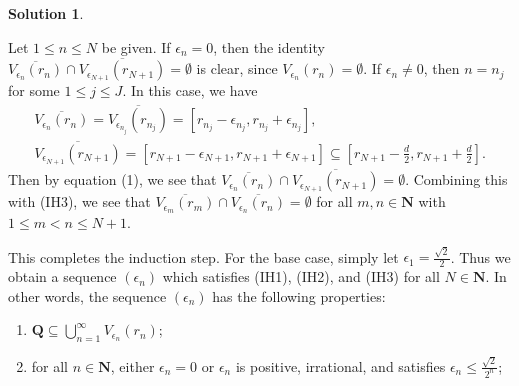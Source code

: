 \documentclass[12pt]{article}
\theoremstyle{definition}
\theoremstyle{exercise}
\theoremstyle{solution}
\newtheorem*{solution}{Solution}
\newcommand{\N}{\mathbf{N}}
\newcommand{\Q}{\mathbf{Q}}
\begin{document}
\begin{solution}
\begin{enumerate}
\begin{description}
            Let \( 1 \leq n \leq N \) be given. If \( \epsilon_n = 0 \), then the identity \( \overline{V_{\epsilon_n}(r_n)} \cap \overline{V_{\epsilon_{N+1}}(r_{N+1})} = \emptyset \) is clear, since \( V_{\epsilon_n}(r_n) = \emptyset \). If \( \epsilon_n \neq 0 \), then \( n = n_j \) for some \( 1 \leq j \leq J \). In this case, we have
            \begin{gather*}
                \overline{V_{\epsilon_n}(r_n)} = \overline{V_{\epsilon_{n_j}}(r_{n_j})} = [r_{n_j} - \epsilon_{n_j}, r_{n_j} + \epsilon_{n_j}], \\[2mm]
                \overline{V_{\epsilon_{N+1}}(r_{N+1})} = [r_{N+1} - \epsilon_{N+1}, r_{N+1} + \epsilon_{N+1}] \subseteq \left[ r_{N+1} - \tfrac{d}{2}, r_{N+1} + \tfrac{d}{2} \right].
            \end{gather*}
            Then by equation (1), we see that \( \overline{V_{\epsilon_n}(r_n)} \cap \overline{V_{\epsilon_{N+1}}(r_{N+1})} = \emptyset \). Combining this with (IH3), we see that \( \overline{V_{\epsilon_m}(r_m)} \cap \overline{V_{\epsilon_n}(r_n)} = \emptyset \) for all \( m, n \in \N \) with \( 1 \leq m < n \leq N + 1 \).
        \end{description}
        This completes the induction step. For the base case, simply let \( \epsilon_1 = \tfrac{\sqrt{2}}{2} \). Thus we obtain a sequence \( (\epsilon_n) \) which satisfies (IH1), (IH2), and (IH3) for all \( N \in \N \). In other words, the sequence \( (\epsilon_n) \) has the following properties:
        \begin{enumerate}[itemsep=8pt, leftmargin=44pt, label=(A\arabic*)]
            \item \( \Q \subseteq \bigcup_{n=1}^{\infty} V_{\epsilon_n}(r_n) \);

            \item for all \( n \in \N \), either \( \epsilon_n = 0 \) or \( \epsilon_n \) is positive, irrational, and satisfies \( \epsilon_n \leq \tfrac{\sqrt{2}}{2^n} \);


\end{enumerate}
\end{enumerate}
\end{solution}
\end{document}
